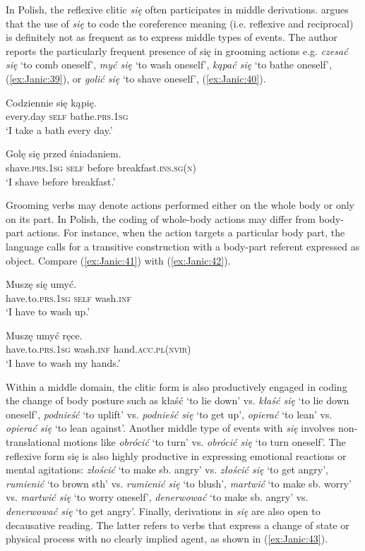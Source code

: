 \documentclass[output=paper]{langscibook}
\begin{document}
In Polish, the reflexive clitic \textit{się} often participates in middle derivations. \citet[20]{Swan2003} argues that the use of \textit{się} to code the coreference meaning (i.e. reflexive and reciprocal) is definitely not as frequent as to express middle types of events. The author reports the particularly frequent presence of się in grooming actions e.g. \textit{czesać się} ‘to comb oneself’, \textit{myć się} ‘to wash oneself’, \textit{kąpać się} ‘to bathe oneself’,(\ref{ex:Janic:39}), or \textit{golić się} ‘to shave oneself’, (\ref{ex:Janic:40}).

\ea \label{ex:Janic:39}
\gll Codziennie	się	 kąpię.\\
	 every.day	\textsc{self}	bathe.\textsc{prs.1sg}\\
\glt ‘I take a bath every day.’
\z 
	
\ea \label{ex:Janic:40}
\gll Golę		 się		 przed	śniadaniem. \\
	 shave.\textsc{prs.1sg}	\textsc{self}		before	breakfast.\textsc{ins.sg(n)}\\
\glt ‘I shave before breakfast.’						 \citep[584]{Swan2003}
\z 	
	
Grooming verbs may denote actions performed either on the whole body or only on its part. In Polish, the coding of whole-body actions may differ from body-part actions. For instance, when the action targets a particular body part, the language calls for a transitive construction with a body-part referent expressed as object. Compare (\ref{ex:Janic:41}) with (\ref{ex:Janic:42}).

\ea \label{ex:Janic:41}
\gll Muszę		 się	 umyć.\\
	 have.to.\textsc{prs.1sg}	\textsc{self}	wash.\textsc{inf}\\
\glt ‘I have to wash up.’
\z
	
\ea \label{ex:Janic:42}
\gll Muszę		 umyć		 ręce.\\
	 have.to.\textsc{prs.1sg}	wash.\textsc{inf}	hand.\textsc{acc.pl(nvir)}\\
\glt ‘I have to wash my hands.’						 \citep[584]{Swan2003}
\z 
	
Within a middle domain, the clitic form is also productively engaged in coding the change of body posture such as kłaść ‘to lie down’ vs. \textit{kłaść się} ‘to lie down oneself’, \textit{podnieść} ‘to uplift’ vs. \textit{podnieść się} ‘to get up’, \textit{opierać} ‘to lean’ vs. \textit{opierać się} ‘to lean against’. Another middle type of events with \textit{się} involves non-translational motions like \textit{obrócić} ‘to turn’ vs. \textit{obrócić się} ‘to turn oneself’. The reflexive form się is also highly productive in expressing emotional reactions or mental agitations: \textit{złościć} ‘to make sb. angry’ vs. \textit{złościć się} ‘to get angry’, \textit{rumienić} ‘to brown sth’ vs. \textit{rumienić się } ‘to blush’, \textit{martwić } ‘to make sb. worry’ vs. \textit{martwić się} ‘to worry oneself’, \textit{denerwować} ‘to make sb. angry’ vs. \textit{denerwować się} ‘to get angry’. Finally, derivations in \textit{się} are also open to decausative reading. The latter refers to verbs that express a change of state or physical process with no clearly implied agent, as shown in (\ref{ex:Janic:43}).
\end{document}
